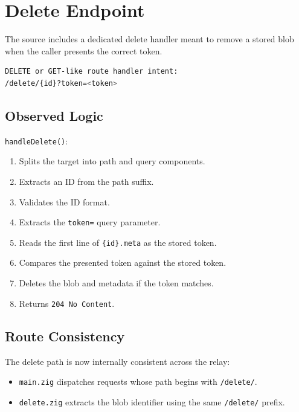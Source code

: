 \documentclass[11pt,a4paper]{report}
\begin{document}
\section{Delete Endpoint}

The source includes a dedicated delete handler meant to remove a stored blob when the caller presents the correct token.

\begin{lstlisting}[language=bash]
DELETE or GET-like route handler intent:
/delete/{id}?token=<token>
\end{lstlisting}

\subsection{Observed Logic}

\texttt{handleDelete()}:

\begin{enumerate}
    \item Splits the target into path and query components.
    \item Extracts an ID from the path suffix.
    \item Validates the ID format.
    \item Extracts the \texttt{token=} query parameter.
    \item Reads the first line of \texttt{\{id\}.meta} as the stored token.
    \item Compares the presented token against the stored token.
    \item Deletes the blob and metadata if the token matches.
    \item Returns \texttt{204 No Content}.
\end{enumerate}

\subsection{Route Consistency}

The delete path is now internally consistent across the relay:

\begin{itemize}[leftmargin=1.5cm]
    \item \texttt{main.zig} dispatches requests whose path begins with \texttt{/delete/}.
    \item \texttt{delete.zig} extracts the blob identifier using the same \texttt{/delete/} prefix.
\end{itemize}
\end{document}

